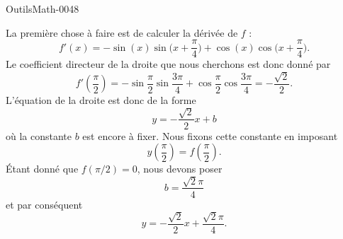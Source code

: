 
\begin{corrige}{OutilsMath-0048}

    La première chose à faire est de calculer la dérivée de $f$ :
    \begin{equation}
        f'(x)=-\sin(x)\sin\big( x+\frac{ \pi }{ 4 } \big)+\cos(x)\cos\big( x+\frac{ \pi }{ 4 } \big).
    \end{equation}
    Le coefficient directeur de la droite que nous cherchons est donc donné par
    \begin{equation}
        f'\left( \frac{ \pi }{ 2 } \right)=-\sin\frac{ \pi }{2}\sin\frac{ 3\pi }{ 4 }+\cos\frac{ \pi }{2}\cos\frac{ 3\pi }{ 4 }=-\frac{ \sqrt{2} }{2}.
    \end{equation}
    L'équation de la droite est donc de la forme
    \begin{equation}
        y=-\frac{ \sqrt{2} }{2}x+b
    \end{equation}
    où la constante $b$ est encore à fixer. Nous fixons cette constante en imposant
    \begin{equation}
        y\left( \frac{ \pi }{2} \right)=f\left( \frac{ \pi }{2} \right).
    \end{equation}
    Étant donné que $f(\pi/2)=0$, nous devons poser
    \begin{equation}
        b=\frac{ \sqrt{2}\pi }{ 4 } 
    \end{equation}
    et par conséquent
    \begin{equation}
        y=-\frac{ \sqrt{2} }{2}x+\frac{ \sqrt{2}\pi }{ 4 }.
    \end{equation}

\end{corrige}
